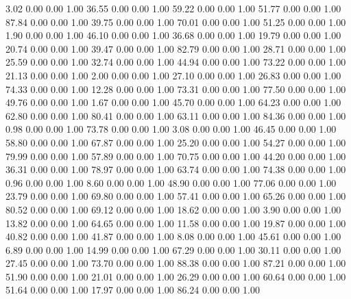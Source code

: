     3.02   0.00   0.00   1.00
   36.55   0.00   0.00   1.00
   59.22   0.00   0.00   1.00
   51.77   0.00   0.00   1.00
   87.84   0.00   0.00   1.00
   39.75   0.00   0.00   1.00
   70.01   0.00   0.00   1.00
   51.25   0.00   0.00   1.00
    1.90   0.00   0.00   1.00
   46.10   0.00   0.00   1.00
   36.68   0.00   0.00   1.00
   19.79   0.00   0.00   1.00
   20.74   0.00   0.00   1.00
   39.47   0.00   0.00   1.00
   82.79   0.00   0.00   1.00
   28.71   0.00   0.00   1.00
   25.59   0.00   0.00   1.00
   32.74   0.00   0.00   1.00
   44.94   0.00   0.00   1.00
   73.22   0.00   0.00   1.00
   21.13   0.00   0.00   1.00
    2.00   0.00   0.00   1.00
   27.10   0.00   0.00   1.00
   26.83   0.00   0.00   1.00
   74.33   0.00   0.00   1.00
   12.28   0.00   0.00   1.00
   73.31   0.00   0.00   1.00
   77.50   0.00   0.00   1.00
   49.76   0.00   0.00   1.00
    1.67   0.00   0.00   1.00
   45.70   0.00   0.00   1.00
   64.23   0.00   0.00   1.00
   62.80   0.00   0.00   1.00
   80.41   0.00   0.00   1.00
   63.11   0.00   0.00   1.00
   84.36   0.00   0.00   1.00
    0.98   0.00   0.00   1.00
   73.78   0.00   0.00   1.00
    3.08   0.00   0.00   1.00
   46.45   0.00   0.00   1.00
   58.80   0.00   0.00   1.00
   67.87   0.00   0.00   1.00
   25.20   0.00   0.00   1.00
   54.27   0.00   0.00   1.00
   79.99   0.00   0.00   1.00
   57.89   0.00   0.00   1.00
   70.75   0.00   0.00   1.00
   44.20   0.00   0.00   1.00
   36.31   0.00   0.00   1.00
   78.97   0.00   0.00   1.00
   63.74   0.00   0.00   1.00
   74.38   0.00   0.00   1.00
    0.96   0.00   0.00   1.00
    8.60   0.00   0.00   1.00
   48.90   0.00   0.00   1.00
   77.06   0.00   0.00   1.00
   23.79   0.00   0.00   1.00
   69.80   0.00   0.00   1.00
   57.41   0.00   0.00   1.00
   65.26   0.00   0.00   1.00
   80.52   0.00   0.00   1.00
   69.12   0.00   0.00   1.00
   18.62   0.00   0.00   1.00
    3.90   0.00   0.00   1.00
   13.82   0.00   0.00   1.00
   64.65   0.00   0.00   1.00
   11.58   0.00   0.00   1.00
   19.87   0.00   0.00   1.00
   40.82   0.00   0.00   1.00
   41.87   0.00   0.00   1.00
    8.08   0.00   0.00   1.00
   45.61   0.00   0.00   1.00
    6.89   0.00   0.00   1.00
   14.99   0.00   0.00   1.00
   67.29   0.00   0.00   1.00
   30.11   0.00   0.00   1.00
   27.45   0.00   0.00   1.00
   73.70   0.00   0.00   1.00
   88.38   0.00   0.00   1.00
   87.21   0.00   0.00   1.00
   51.90   0.00   0.00   1.00
   21.01   0.00   0.00   1.00
   26.29   0.00   0.00   1.00
   60.64   0.00   0.00   1.00
   51.64   0.00   0.00   1.00
   17.97   0.00   0.00   1.00
   86.24   0.00   0.00   1.00
